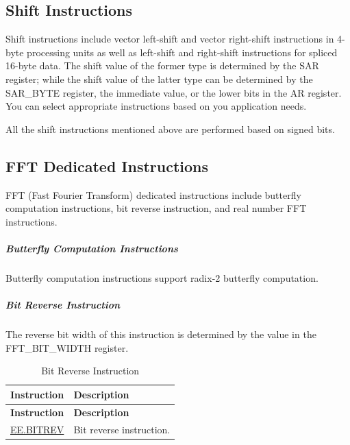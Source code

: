 \documentclass[main\_\_EN.tex]{subfiles}
\begin{document}
\subsection{Shift Instructions}
\label{sec:pie-shift-instrucitons}

Shift instructions include vector left-shift and vector right-shift instructions in 4-byte processing units as well as left-shift and right-shift instructions for spliced 16-byte data. The shift value of the former type is determined by the SAR register; while the shift value of the latter type can be determined by the SAR\_BYTE register, the immediate value, or the lower bits in the AR register. You can select appropriate instructions based on you application needs.

All the shift instructions mentioned above are performed based on signed bits.



\subsection{FFT Dedicated Instructions}
\label{sec:pie-fft-instrucitons}

FFT (Fast Fourier Transform) dedicated instructions include butterfly computation instructions, bit reverse instruction, and real number FFT instructions.

\subparagraph{Butterfly Computation Instructions}

Butterfly computation instructions support radix-2 butterfly computation.





\subparagraph{Bit Reverse Instruction}

The reverse bit width of this instruction is determined by the value in the FFT\_BIT\_WIDTH register.

\begin{longtable}[c]{|l|m{10cm}|}
    \caption{Bit Reverse Instruction}
    \label{tab:pie-bitrev-instructions}\\
    \hline
    \rowcolor{lightgray}
    \textbf{Instruction} & \textbf{Description} \\\hline
    \endfirsthead
    \rowcolor{lightgray}
    \textbf{Instruction} & \textbf{Description} \\\hline
    \endhead
    \endfoot

    \hyperref[instruction:EEBITREV]{EE.BITREV} & Bit reverse instruction.
    \\\hline
\end{longtable}
\end{document}

